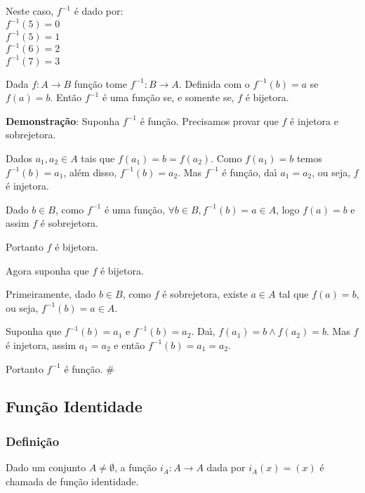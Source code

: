 Neste caso, $f^{-1}$ {\'e} dado por:\\
$f^{-1}(5)=0$\\
$f^{-1}(5)=1$\\
$f^{-1}(6)=2$\\
$f^{-1}(7)=3$

\begin{teorema}
Dada $f:A\rightarrow B$ fun{\c c}{\~a}o tome $f^{-1}:B\rightarrow A$. Definida com o $f^{-1}(b)=a$ se $f(a)=b$. Ent{\~a}o $f^{-1}$ {\'e} uma fun{\c c}{\~a}o se, e somente se, $f$ {\'e} bijetora.
\end{teorema}

\textbf{Demonstra{\c c}{\~a}o}: Suponha $f^{-1}$ {\'e} fun{\c c}{\~a}o. Precisamos provar que $f$ {\'e} injetora e sobrejetora.

Dados $a_{1},a_{2}\in A$ tais que $f(a_{1})=b=f(a_{2})$. Como $f(a_{1})=b$ temos $f^{-1}(b)=a_{1}$, al{\'e}m disso, $f^{-1}(b)=a_{2}$. Mas $f^{-1}$ {\'e} fun{\c c}{\~a}o, da{\'\i} $a_{1}=a_{2}$, ou seja, $f$ {\'e} injetora.

Dado $b\in B$, como $f^{-1}$ {\'e} uma fun{\c c}{\~a}o, $\forall b\in B, f^{-1}(b)=a\in A$, logo $f(a)=b$ e assim $f$ {\'e} sobrejetora.

Portanto $f$ {\'e} bijetora.

Agora suponha que $f$ {\'e} bijetora.

Primeiramente, dado $b\in B$, como $f$ {\'e} sobrejetora, existe $a\in A$ tal que $f(a)=b$, ou seja, $f^{-1}(b)=a\in A$.

Suponha que $f^{-1}(b)=a_{1}$ e $f^{-1}(b)=a_{2}$. Da{\'\i}, $f(a_{1})=b\wedge f(a_{2})=b$. Mas $f$ {\'e} injetora, assim $a_{1}=a_{2}$ e ent{\~a}o $f^{-1}(b)=a_{1}=a_{2}$.

Portanto $f^{-1}$ {\'e} fun{\c c}{\~a}o. \#



\subsection{Fun{\c c}{\~a}o Identidade}
\subsubsection{Defini{\c c}{\~a}o}
\begin{definicao} Dado um conjunto $A\neq\emptyset$, a fun{\c c}{\~a}o $i_{A}:A\rightarrow A$ dada por $i_{A}(x)=(x)$ {\'e} chamada de fun{\c c}{\~a}o identidade.\end{definicao}

